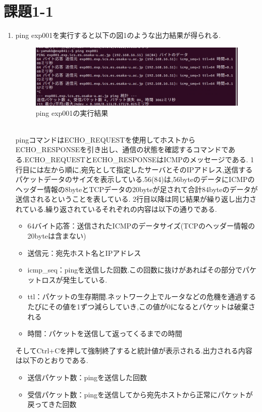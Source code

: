 \documentclass[dvipdfmx]{jarticle}
\begin{document}
\section{課題1-1}
\begin{enumerate}
    \item ping exp001を実行すると以下の図1のような出力結果が得られる.
    \begin{figure}[h]
        \centering
        \includegraphics[width=14cm]{1-1-1.png}
        \caption{ping exp001の実行結果}
    \end{figure}
    \\pingコマンドはECHO\_REQUESTを使用してホストからECHO\_RESPONSEを引き出し、通信の状態を確認するコマンドである.ECHO\_REQUESTとECHO\_RESPONSEはICMPのメッセージである.
    1行目には左から順に,宛先として指定したサーバとそのIPアドレス,送信するパケットデータのサイズを表示している.56(84)は,56byteのデータにICMPのヘッダー情報の8byteとTCPデータの20byteが足されて合計84byteのデータが送信されるということを表している.
    2行目以降は同じ結果が繰り返し出力されている.繰り返されているそれぞれの内容は以下の通りである.
    \begin{itemize}
        \item 64バイト応答：送信されたICMPのデータサイズ(TCPのヘッダー情報の20byteは含まない)
        \item 送信元：宛先ホスト名とIPアドレス
        \item icmp\_seq：pingを送信した回数.この回数に抜けがあればその部分でパケットロスが発生している.
        \item ttl：パケットの生存期間.ネットワーク上でルータなどの危機を通過するたびにその値を1ずつ減らしていき,この値が0になるとパケットは破棄される
        \item 時間：パケットを送信して返ってくるまでの時間
    \end{itemize}
    そしてCtrl+Cを押して強制終了すると統計値が表示される.出力される内容は以下のとおりである.
    \begin{itemize}
        \item 送信パケット数：pingを送信した回数
        \item 受信パケット数：pingを送信してから宛先ホストから正常にパケットが戻ってきた回数

\end{itemize}
\end{enumerate}
\end{document}
